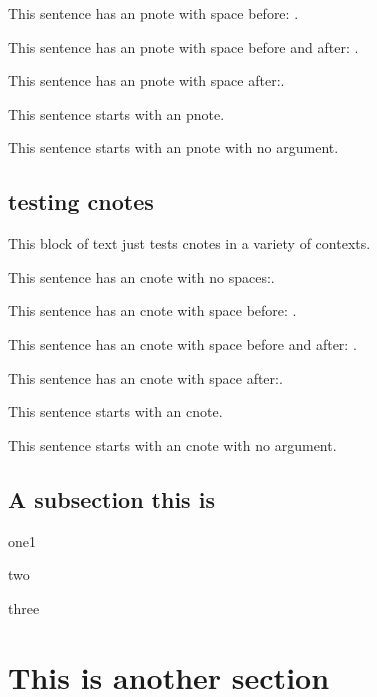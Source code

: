 \documentclass[draft, nonotes]{compact_proposal}
\begin{document}
This sentence has an pnote with space before: .

This sentence has an pnote with space before and after:  .

This sentence has an pnote with space after: .

 This sentence starts with an pnote.

\pnote This sentence starts with an pnote with no argument.

\subsection{testing cnotes}

This block of text just tests cnotes in a variety of contexts.

This sentence has an cnote with no spaces:.

This sentence has an cnote with space before: .

This sentence has an cnote with space before and after:  .

This sentence has an cnote with space after: .

 This sentence starts with an cnote.

\cnote This sentence starts with an cnote with no argument.

\subsection{A subsection this is}
\blindtext[1]
\begin{tightitemize}
	\item one1
	\item two
	\item three
\end{tightitemize}

\section{This is another section}
\blindtext[6]
\end{document}
